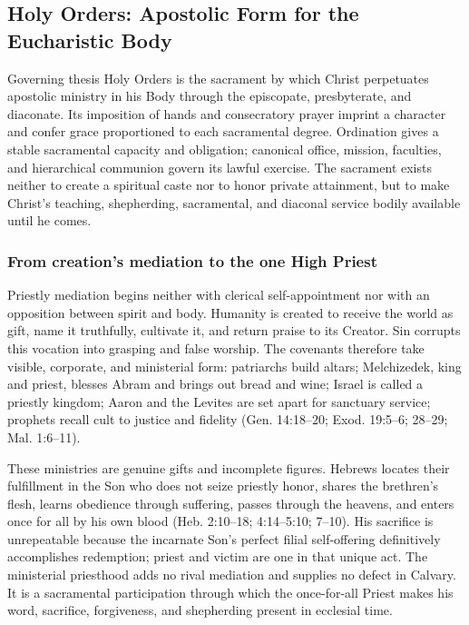 \subsection{Holy Orders: Apostolic Form for the Eucharistic Body}

\begin{studybox}{Governing thesis}
Holy Orders is the sacrament by which Christ perpetuates apostolic ministry in his Body through the episcopate, presbyterate, and diaconate. Its imposition of hands and consecratory prayer imprint a character and confer grace proportioned to each sacramental degree. Ordination gives a stable sacramental capacity and obligation; canonical office, mission, faculties, and hierarchical communion govern its lawful exercise. The sacrament exists neither to create a spiritual caste nor to honor private attainment, but to make Christ's teaching, shepherding, sacramental, and diaconal service bodily available until he comes.
\end{studybox}

\subsubsection{From creation's mediation to the one High Priest}

Priestly mediation begins neither with clerical self-appointment nor with an opposition between spirit and body. Humanity is created to receive the world as gift, name it truthfully, cultivate it, and return praise to its Creator. Sin corrupts this vocation into grasping and false worship. The covenants therefore take visible, corporate, and ministerial form: patriarchs build altars; Melchizedek, king and priest, blesses Abram and brings out bread and wine; Israel is called a priestly kingdom; Aaron and the Levites are set apart for sanctuary service; prophets recall cult to justice and fidelity (Gen. 14:18--20; Exod. 19:5--6; 28--29; Mal. 1:6--11).

These ministries are genuine gifts and incomplete figures. Hebrews locates their fulfillment in the Son who does not seize priestly honor, shares the brethren's flesh, learns obedience through suffering, passes through the heavens, and enters once for all by his own blood (Heb. 2:10--18; 4:14--5:10; 7--10). His sacrifice is unrepeatable because the incarnate Son's perfect filial self-offering definitively accomplishes redemption; priest and victim are one in that unique act. The ministerial priesthood adds no rival mediation and supplies no defect in Calvary. It is a sacramental participation through which the once-for-all Priest makes his word, sacrifice, forgiveness, and shepherding present in ecclesial time.

